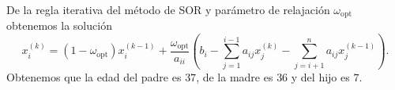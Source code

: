 \begin{frame}
\begin{solution}
\begin{enumerate}[b)]
			      De la regla iterativa del método de SOR y parámetro de
			      relajación $\omega_{\text{opt}}$ obtenemos la solución
			      \begin{equation*}
				      x_{i}^{\left(k\right)}=
				      \left(1-\omega_{\text{opt}}\right)
				      x_{i}^{\left(k-1\right)}+
				      \dfrac{\omega_{\text{opt}}}{a_{ii}}
				      \left(
				      b_{i}-
				      \sum\limits_{j=1}^{i-1}
				      a_{ij}x_{j}^{\left(k\right)}-
				      \sum\limits_{j=i+1}^{n}
				      a_{ij}x_{j}^{\left(k-1\right)}
				      \right).
			      \end{equation*}
			      Obtenemos que la edad del \alert{padre es $37$}, de la
			      \alert{madre es $36$} y del \alert{hijo es $7$}.
		\end{enumerate}
	\end{solution}
\end{frame}

\begin{frame}[fragile]
	\begin{columns}
		\begin{column}{0.48\textwidth}
			\inputminted[fontsize=\tiny,firstline=1,lastline=24]{python}{p4_sor.py}
		\end{column}
		\begin{column}{0.48\textwidth}
			\inputminted[fontsize=\tiny,firstline=26,lastline=52]{python}{p4_sor.py}
		\end{column}
	\end{columns}
\end{frame}

\begin{frame}[fragile]
	\begin{columns}
		\begin{column}{0.48\textwidth}
			\inputminted[fontsize=\tiny,firstline=1,lastline=29]{text}{p4_sor.txt}
		\end{column}
		\begin{column}{0.48\textwidth}
			\inputminted[fontsize=\tiny,firstline=30,lastline=53]{text}{p4_sor.txt}
		\end{column}
	\end{columns}
\end{frame}

